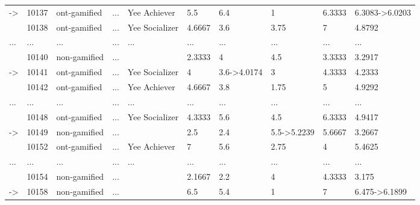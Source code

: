 \documentclass[6pt,a4paper]{article}
\begin{document}
\begin{landscape}
{\begin{longtable}{llllllllll}
-\textgreater &10137&ont-gamified&...&Yee Achiever&5.5&6.4&1&6.3333&6.3083-\textgreater 6.0203\tabularnewline
&10138&ont-gamified&...&Yee Socializer&4.6667&3.6&3.75&7&4.8792\tabularnewline
...&...&...&...&...&...&...&...&...&...\tabularnewline
&10140&non-gamified&...&&2.3333&4&4.5&3.3333&3.2917\tabularnewline
-\textgreater &10141&ont-gamified&...&Yee Socializer&4&3.6-\textgreater 4.0174&3&4.3333&4.2333\tabularnewline
&10142&ont-gamified&...&Yee Achiever&4.6667&3.8&1.75&5&4.9292\tabularnewline
...&...&...&...&...&...&...&...&...&...\tabularnewline
&10148&ont-gamified&...&Yee Socializer&4.3333&5.6&4.5&6.3333&4.9417\tabularnewline
-\textgreater &10149&non-gamified&...&&2.5&2.4&5.5-\textgreater 5.2239&5.6667&3.2667\tabularnewline
&10152&ont-gamified&...&Yee Achiever&7&5.6&2.75&4&5.4625\tabularnewline
...&...&...&...&...&...&...&...&...&...\tabularnewline
&10154&non-gamified&...&&2.1667&2.2&4&4.3333&3.175\tabularnewline
-\textgreater &10158&non-gamified&...&&6.5&5.4&1&7&6.475-\textgreater 6.1899\tabularnewline
\hline
\end{longtable}}

\end{landscape}
\end{document}
